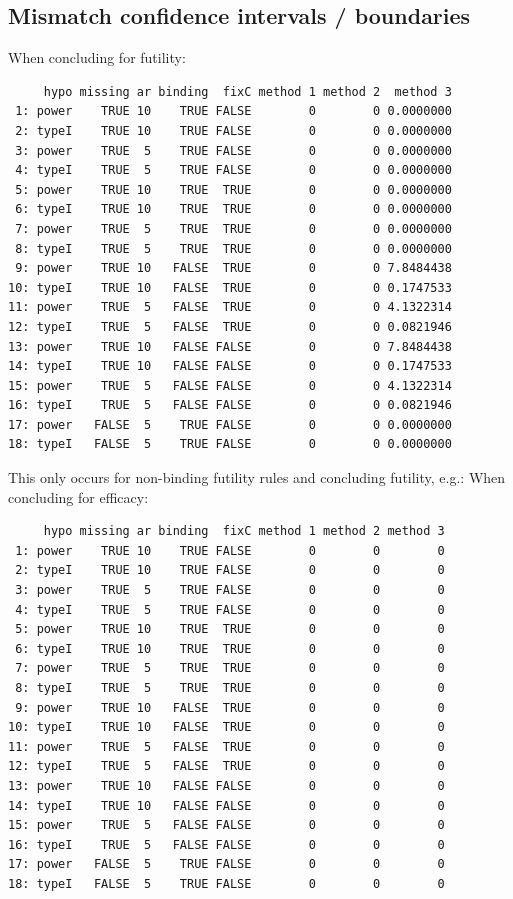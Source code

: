 \documentclass[12pt]{article}
\begin{document}
\clearpage

\subsection{Mismatch confidence intervals / boundaries}
\label{sec:orgfc4443b}

When concluding for futility:
\begin{verbatim}
     hypo missing ar binding  fixC method 1 method 2  method 3
 1: power    TRUE 10    TRUE FALSE        0        0 0.0000000
 2: typeI    TRUE 10    TRUE FALSE        0        0 0.0000000
 3: power    TRUE  5    TRUE FALSE        0        0 0.0000000
 4: typeI    TRUE  5    TRUE FALSE        0        0 0.0000000
 5: power    TRUE 10    TRUE  TRUE        0        0 0.0000000
 6: typeI    TRUE 10    TRUE  TRUE        0        0 0.0000000
 7: power    TRUE  5    TRUE  TRUE        0        0 0.0000000
 8: typeI    TRUE  5    TRUE  TRUE        0        0 0.0000000
 9: power    TRUE 10   FALSE  TRUE        0        0 7.8484438
10: typeI    TRUE 10   FALSE  TRUE        0        0 0.1747533
11: power    TRUE  5   FALSE  TRUE        0        0 4.1322314
12: typeI    TRUE  5   FALSE  TRUE        0        0 0.0821946
13: power    TRUE 10   FALSE FALSE        0        0 7.8484438
14: typeI    TRUE 10   FALSE FALSE        0        0 0.1747533
15: power    TRUE  5   FALSE FALSE        0        0 4.1322314
16: typeI    TRUE  5   FALSE FALSE        0        0 0.0821946
17: power   FALSE  5    TRUE FALSE        0        0 0.0000000
18: typeI   FALSE  5    TRUE FALSE        0        0 0.0000000
\end{verbatim}

This only occurs for non-binding futility rules and concluding futility, e.g.:
When concluding for efficacy:
\begin{verbatim}
     hypo missing ar binding  fixC method 1 method 2 method 3
 1: power    TRUE 10    TRUE FALSE        0        0        0
 2: typeI    TRUE 10    TRUE FALSE        0        0        0
 3: power    TRUE  5    TRUE FALSE        0        0        0
 4: typeI    TRUE  5    TRUE FALSE        0        0        0
 5: power    TRUE 10    TRUE  TRUE        0        0        0
 6: typeI    TRUE 10    TRUE  TRUE        0        0        0
 7: power    TRUE  5    TRUE  TRUE        0        0        0
 8: typeI    TRUE  5    TRUE  TRUE        0        0        0
 9: power    TRUE 10   FALSE  TRUE        0        0        0
10: typeI    TRUE 10   FALSE  TRUE        0        0        0
11: power    TRUE  5   FALSE  TRUE        0        0        0
12: typeI    TRUE  5   FALSE  TRUE        0        0        0
13: power    TRUE 10   FALSE FALSE        0        0        0
14: typeI    TRUE 10   FALSE FALSE        0        0        0
15: power    TRUE  5   FALSE FALSE        0        0        0
16: typeI    TRUE  5   FALSE FALSE        0        0        0
17: power   FALSE  5    TRUE FALSE        0        0        0
18: typeI   FALSE  5    TRUE FALSE        0        0        0
\end{verbatim}
\end{document}
